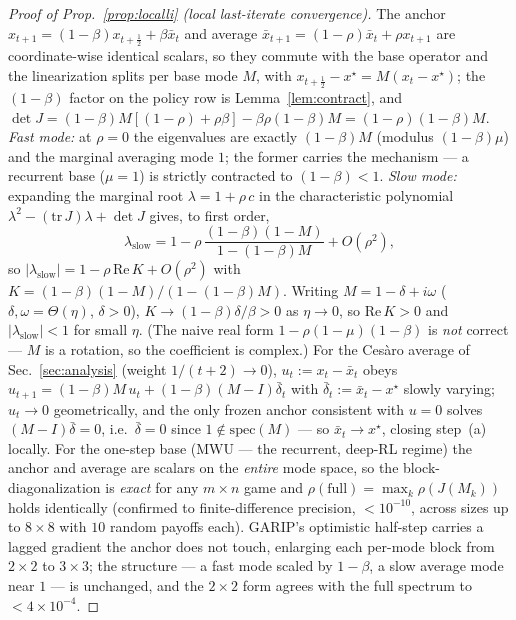 \documentclass[10pt,twocolumn]{article}
\theoremstyle{plain}
\theoremstyle{remark}
\begin{document}
\begin{proof}[Proof of Prop.~\ref{prop:localli} (local last-iterate convergence)]
The anchor $x_{t+1}=(1-\beta)x_{t+\frac12}+\beta\bar x_t$ and average
$\bar x_{t+1}=(1-\rho)\bar x_t+\rho x_{t+1}$ are coordinate-wise identical scalars, so
they commute with the base operator and the linearization splits per base mode $M$,
with $x_{t+\frac12}-x^\star=M(x_t-x^\star)$; the $(1-\beta)$ factor on the policy row is
Lemma~\ref{lem:contract}, and $\det J=(1-\beta)M[(1-\rho)+\rho\beta]-\beta\rho(1-\beta)M
=(1-\rho)(1-\beta)M$. \emph{Fast mode:} at $\rho=0$ the eigenvalues are exactly
$(1-\beta)M$ (modulus $(1-\beta)\mu$) and the marginal averaging mode $1$; the former
carries the mechanism --- a recurrent base ($\mu=1$) is strictly contracted to
$(1-\beta)<1$. \emph{Slow mode:} expanding the marginal root $\lambda=1+\rho\,c$ in the
characteristic polynomial $\lambda^2-(\mathrm{tr}\,J)\lambda+\det J$ gives, to first
order,
\[
\lambda_{\mathrm{slow}}=1-\rho\,\frac{(1-\beta)(1-M)}{1-(1-\beta)M}+O(\rho^2),
\]
so $|\lambda_{\mathrm{slow}}|=1-\rho\,\mathrm{Re}\,K+O(\rho^2)$ with
$K=(1-\beta)(1-M)/(1-(1-\beta)M)$. Writing $M=1-\delta+i\omega$ ($\delta,\omega=\Theta(\eta)$,
$\delta>0$), $K\to(1-\beta)\delta/\beta>0$ as $\eta\to0$, so $\mathrm{Re}\,K>0$ and
$|\lambda_{\mathrm{slow}}|<1$ for small $\eta$. (The naive real form
$1-\rho(1-\mu)(1-\beta)$ is \emph{not} correct --- $M$ is a rotation, so the coefficient
is complex.) For the Ces\`aro average of Sec.~\ref{sec:analysis} (weight
$1/(t{+}2)\!\to\!0$), $u_t:=x_t-\bar x_t$ obeys
$u_{t+1}=(1-\beta)M\,u_t+(1-\beta)(M-I)\bar\delta_t$ with
$\bar\delta_t:=\bar x_t-x^\star$ slowly varying; $u_t\to0$ geometrically, and the only
frozen anchor consistent with $u\!=\!0$ solves $(M-I)\bar\delta=0$, i.e.\
$\bar\delta=0$ since $1\notin\mathrm{spec}(M)$ --- so $\bar x_t\to x^\star$, closing
step~(a) locally. For the one-step base (MWU --- the recurrent, deep-RL regime) the
anchor and average are scalars on the \emph{entire} mode space, so the
block-diagonalization is \emph{exact} for any $m\times n$ game and
$\rho(\text{full})=\max_k\rho(J(M_k))$ holds identically (confirmed to
finite-difference precision, $<\!10^{-10}$, across sizes up to $8\times8$ with $10$
random payoffs each). GARIP's optimistic half-step carries a lagged gradient the anchor
does not touch, enlarging each per-mode block from $2\times2$ to $3\times3$; the
structure --- a fast mode scaled by $1-\beta$, a slow average mode near $1$ --- is
unchanged, and the $2\times2$ form agrees with the full spectrum to $<\!4\times10^{-4}$.
\end{proof}
\end{document}
